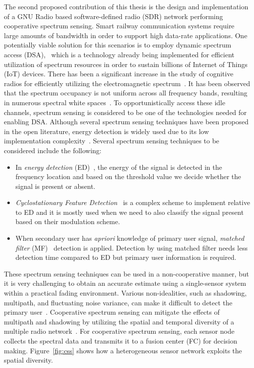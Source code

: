 The second proposed contribution of this thesis is the design and implementation of a GNU Radio based software-defined radio (SDR) network performing cooperative spectrum sensing. Smart railway communication systems require large amounts of bandwidth in order to support high data-rate applications. One potentially viable solution for this scenarios is to employ dynamic spectrum access (DSA),~\cite{arhtn2,arhtn3} which is a technology already being implemented for efficient utilization of spectrum resources in order to sustain billions of Internet of Things (IoT) devices. There has been a significant increase in the study of cognitive radios for efficiently utilizing the electromagnetic spectrum~\cite{bookhtn1}. It has been observed that the spectrum occupancy is not uniform across all frequency bands, resulting in numerous spectral white spaces~\cite{bookhtn1}. To opportunistically access these idle channels, spectrum sensing is considered to be one of the technologies needed for enabling DSA. Although several spectrum sensing techniques have been proposed in the open literature, energy detection is widely used due to its low implementation complexity~\cite{arhtn4}. Several spectrum sensing techniques to be considered include the following:
\begin{itemize}
\item In \textit{energy detection} (ED)~\cite{arhtn4}, the energy of the signal is detected in the frequency location and based on the threshold value we decide whether the signal is present or absent.

\item \textit{Cyclostationary Feature Detection}~\cite{chen2008cyclostationary} is a complex scheme to implement relative to ED and it is mostly used when we need to also classify the signal present based on their modulation scheme.

\item When secondary user has \textit{apriori} knowledge of primary user signal, \textit{matched  filter} (MF)~\cite{kapoor2011opportunistic}  detection  is  applied. Detection by using matched filter needs less detection time compared to ED but primary user information is required.
\end{itemize}

These spectrum sensing techniques can be used in a non-cooperative manner, but it is very challenging to obtain an accurate estimate using a single-sensor system within a practical fading environment. Various non-idealities, such as shadowing, multipath, and fluctuating noise variance, can make it difficult to detect the primary user~\cite{inphtn5,inphtn6}. Cooperative spectrum sensing can mitigate the effects of multipath and shadowing by utilizing the spatial and temporal diversity of a multiple radio network~\cite{inphtn7,inphtn8}. For cooperative spectrum sensing, each sensor node collects the spectral data and transmits it to a fusion center (FC) for decision making. Figure~\ref{fig:css} shows how a heterogeneous sensor network exploits the spatial diversity. 

